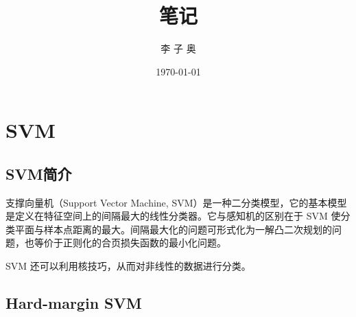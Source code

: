 \documentclass[forprint]{report}
\begin{document}

\title{笔记} %
\author{李 子 奥} %
\date{\today} %


\maketitle
\frontmatter
{}              %

\tableofcontents
\thispagestyle{empty}				%


\mainmatter %
\pagestyle{plain}%
\baselineskip=23pt  %

\chapter{SVM}

\section{SVM简介}

支撑向量机（Support Vector Machine, SVM）是一种二分类模型\cite{r3}，它的基本模型是定义在特征空间上的间隔最大的线性分类器。它与感知机的区别在于 SVM 使分类平面与样本点距离的最大。间隔最大化的问题可形式化为一解凸二次规划的问题，也等价于正则化的合页损失函数的最小化问题。


SVM 还可以利用核技巧，从而对非线性的数据进行分类。

\section{Hard-margin SVM}
\end{document}
